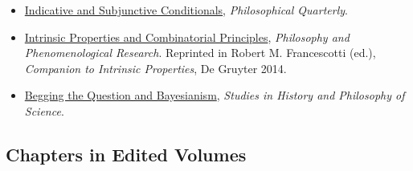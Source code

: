 \documentclass[
  10pt,
  letterpaper,
  DIV=11,
  numbers=noendperiod,
  twoside]{scrartcl}
\begin{document}
\begin{itemize}
{  Indexicals}, \emph{Analysis}.
\item
  \href{https://brian.weatherson.org/quarto/posts/indsub/indicative-and-subjunctive-conditionals.html}{Indicative
  and Subjunctive Conditionals}, \emph{Philosophical Quarterly}.
\item
  \href{https://brian.weatherson.org/quarto/posts/ipacp/intrinsic-properties-and-combinatorial-principles.html}{Intrinsic
  Properties and Combinatorial Principles}, \emph{Philosophy and
  Phenomenological Research}. Reprinted in Robert M. Francescotti (ed.),
  \emph{Companion to Intrinsic Properties}, De Gruyter 2014.
\item
  \href{https://brian.weatherson.org/quarto/posts/bqb/begging-the-question-and-bayesians.html}{Begging
  the Question and Bayesianism}, \emph{Studies in History and Philosophy
  of Science}.
\end{itemize}

\subsection{Chapters in Edited
Volumes}\label{chapters-in-edited-volumes}
\end{document}

